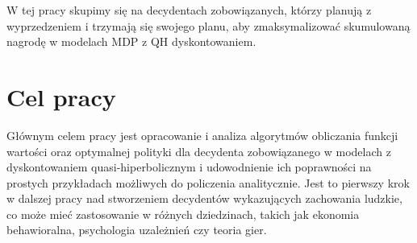 W tej pracy skupimy się na decydentach zobowiązanych, którzy planują z wyprzedzeniem i trzymają się swojego planu, aby zmaksymalizować skumulowaną nagrodę w modelach MDP z QH dyskontowaniem.

\section{Cel pracy}

Głównym celem pracy jest opracowanie i analiza algorytmów obliczania funkcji wartości oraz optymalnej polityki dla decydenta zobowiązanego w modelach z dyskontowaniem quasi-hiperbolicznym i udowodnienie ich poprawności na prostych przykładach możliwych do policzenia analitycznie. Jest to pierwszy krok w dalszej pracy nad stworzeniem decydentów wykazujących zachowania ludzkie, co może mieć zastosowanie w różnych dziedzinach, takich jak ekonomia behawioralna, psychologia uzależnień czy teoria gier. \\


